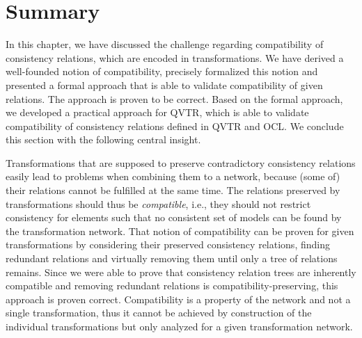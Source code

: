 \section{Summary}

In this chapter, we have discussed the challenge regarding compatibility of consistency relations, which are encoded in transformations.
We have derived a well-founded notion of compatibility, precisely formalized this notion and presented a formal approach that is able to validate compatibility of given relations.
The approach is proven to be correct.
Based on the formal approach, we developed a practical approach for \gls{QVTR}, which is able to validate compatibility of consistency relations defined in \gls{QVTR} and \gls{OCL}.
We conclude this section with the following central insight.

\begin{insight}[Compatibility]
    Transformations that are supposed to preserve contradictory consistency relations easily lead to problems when combining them to a network, because (some of) their relations cannot be fulfilled at the same time.
    The relations preserved by transformations should thus be \emph{compatible}, i.e., they should not restrict consistency for elements such that no consistent set of models can be found by the transformation network.
    That notion of compatibility can be proven for given transformations by considering their preserved consistency relations, finding redundant relations and virtually removing them until only a tree of relations remains. Since we were able to prove that consistency relation trees are inherently compatible and removing redundant relations is compatibility-preserving, this approach is proven correct.
    Compatibility is a property of the network and not a single transformation, thus it cannot be achieved by construction of the individual transformations but only analyzed for a given transformation network.
\end{insight}


